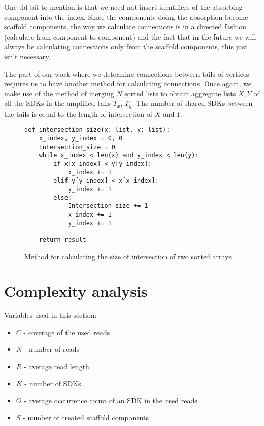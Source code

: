 One tid-bit to mention is that we need not insert identifiers of the absorbing component into the index. Since the components doing the absorption become scaffold components,  the way we calculate connections is in a directed fashion (calculate from component to component) and the fact that in the future we will always be calculating connections only from the scaffold components, this just isn’t necessary.

The part of our work where we determine connections between tails of vertices requires us to have another method for calculating connections. Once again, we make use of the method of merging $N$ sorted lists to obtain aggregate lists $X, Y$ of all the SDKs in the amplified tails $T_x$, $T_y$. The number of shared SDKs between the tails is equal to the length of intersection of $X$ and $Y$.

\begin{figure}[H]
\lstset{language=Python}
\begin{lstlisting}[basicstyle=\small]
def intersection_size(x: list, y: list):
    x_index, y_index = 0, 0
    Intersection_size = 0
    while x_index < len(x) and y_index < len(y):
        if x[x_index] < y[y_index]:
            x_index += 1
        elif y[y_index] < x[x_index]:
            y_index += 1
        else:
            Intersection_size += 1
            x_index += 1
            y_index += 1
            
    return result
\end{lstlisting}
\caption{Method for calculating the size of intersection of two sorted arrays}
\label{fig:merge_sorted}
\end{figure}

\section{Complexity analysis}

Variables used in this section:
\begin{itemize}
	\item{$C$ - coverage of the used reads}
	\item{$N$ - number of reads}
	\item{$R$ - average read length}
	\item{$K$ - number of SDKs}
	\item{$O$ - average occurrence count of an SDK in the used reads}
	\item{$S$ - number of created scaffold components}
\end{itemize}

